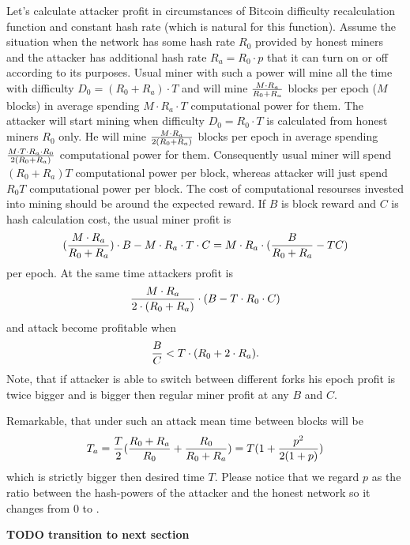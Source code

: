 \documentclass[number,preprint,review]{elsarticle}
\def\infinity{\rotatebox{90}{8}}
\begin{document}
Let's calculate attacker profit in circumstances of Bitcoin difficulty recalculation function and constant hash rate (which is natural for this function).
Assume the situation when the network has some hash rate \(R_0\) provided by honest miners and the attacker has additional hash rate \(R_a=R_0\cdot p\) that it can turn on or off according to its purposes.
Usual miner with such a power will mine all the time with difficulty \(D_0=(R_0+R_a)\cdot T\) and will mine \(M\cdot R_a\over R_0+R_a\) blocks per epoch (\(M\) blocks) in average spending \(M\cdot R_a\cdot T\) computational power for them.
The attacker will start mining when difficulty \(D_0=R_0\cdot T\) is calculated from honest miners \(R_0\) only.
He will mine \(M\cdot R_a\over 2(R_0+R_a)\) blocks per epoch in average spending \(M\cdot T\cdot R_a\cdot R_0\over 2(R_0+R_a)\) computational power for them.
Consequently usual miner will spend \((R_0+R_a)T\) computational power per block, whereas attacker will just spend \(R_0T\) computational power per block.
The cost of computational resourses invested into mining should be around the expected reward.
If \(B\) is block reward and \(C\) is hash calculation cost, the usual miner profit is
\begin{equation}
{({M\cdot R_a\over R_0+R_a})\cdot B-M\cdot R_a\cdot T\cdot C=M\cdot R_a\cdot ({B\over R_0+R_a}-TC)}
\end{equation}
per epoch.
At the same time attackers profit is
\begin{equation}
{{M\cdot R_a \over 2\cdot (R_0+R_a)}\cdot (B - T\cdot R_0\cdot C)}
\end{equation}
and attack become profitable when
\begin{equation}
{{B\over C} < T\cdot (R_0+2\cdot R_a)}.
\end{equation}
Note, that if attacker is able to switch between different forks his epoch profit is twice bigger and is bigger then regular miner profit at any \(B\) and \(C\).


Remarkable, that under such an attack mean time between blocks will be
\begin{equation}
\label{eq:ati}
{T_a={T\over 2}({R_0+R_a\over R_0} + {R_0\over R_0+R_a})=T(1 + {p^2\over 2(1+p)})}
\end{equation}
which is strictly bigger then desired time \(T\).
Please notice that we regard \(p\) as the ratio between the hash-powers of the attacker and the honest network so it changes from 0 to \infinity.

\textbf{TODO transition to next section}
\end{document}
